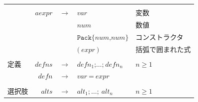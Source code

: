 \documentclass{jbook}
\begin{document}
\begin{center}
\begin{tabular} {|l r c l l|}
		                     &           &               &                                                                                                                                                                  &                         \\
		                     & $aexpr$   & $\rightarrow$ & $var$                                                                                                                                                            & 変数                    \\
		                     &           & \textbar      & $num$                                                                                                                                                            & 数値                    \\
		                     &           & \textbar      & $\texttt{Pack\{} num \texttt{,} num \texttt{\}}$                                                                                                                 & コンストラクタ          \\
		                     &           & \textbar      & $\texttt{(} ~ expr ~ \texttt{)}$                                                                                                                                 & 括弧で囲まれた式        \\
		                     &           &               &                                                                                                                                                                  &                         \\
		定義                 & $defns$   & $\rightarrow$ & $defn_1 \texttt{;} \ldots \texttt{;} ~ defn_n$                                                                                                                   & $n \geq 1$              \\
		                     & $defn$    & $\rightarrow$ & $var ~ \texttt{=} ~ expr$                                                                                                                                        &                         \\
		                     &           &               &                                                                                                                                                                  &                         \\
		選択肢               & $alts$    & $\rightarrow$ & $alt_1 ; \ldots ; ~ alt_n$                                                                                                                                       & $n \geq 1$              \\

\end{tabular}
\end{center}
\end{document}
